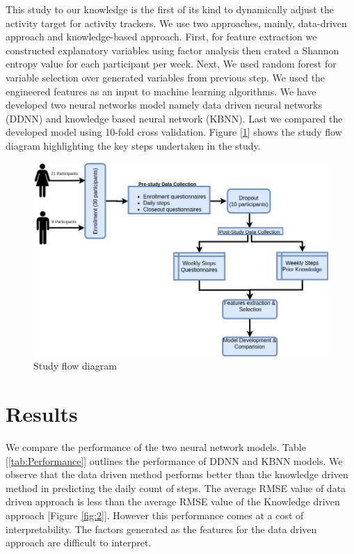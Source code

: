 \documentclass[preprint,12pt]{elsarticle}
\begin{document}
This study to our knowledge is the first of its kind to dynamically adjust the activity target for activity trackers. We use two approaches, mainly, data-driven approach and knowledge-based approach. First, for feature extraction we constructed explanatory variables using factor analysis then crated a Shannon entropy value for each participant per week. Next, We used random forest for variable selection over generated variables from previous step. We used the engineered features as an input to machine learning algorithms. We have developed two neural networks model namely data driven neural networks (DDNN) and knowledge based neural network (KBNN). Last we compared the developed model using 10-fold cross validation. Figure [\ref{fig:1}] shows the study flow diagram highlighting the key steps undertaken in the study.


\begin{figure}[H]
\centering\includegraphics[width=1\linewidth]{Flow_chart.png}
\caption{Study flow diagram} 
\label{fig:1}
\end{figure}

\section{Results}

We compare the performance of the two neural network models. Table [\ref{tab:Performance}] outlines the performance of DDNN and KBNN models. We observe that the data driven method performs better than the knowledge driven method in predicting the daily count of steps. The average RMSE value of data driven approach is less than the average RMSE value of the Knowledge driven approach [Figure \ref{fig:2}]. However this performance comes at a cost of interpretability. The factors generated as the features for the data driven approach are difficult to interpret. 
\end{document}
